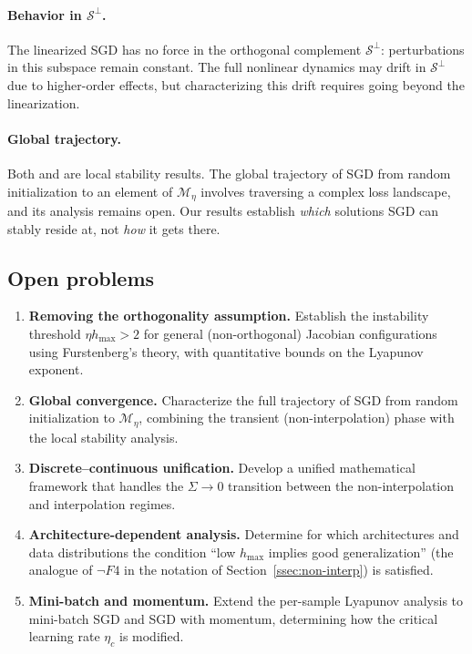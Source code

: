 \documentclass[11pt,a4paper]{article}
\theoremstyle{definition}
\theoremstyle{remark}
\newcommand{\cM}{\mathcal{M}}
\newcommand{\cS}{\mathcal{S}}
\begin{document}
\paragraph{Behavior in $\cS^\perp$.}
The linearized SGD has no force in the orthogonal complement $\cS^\perp$: perturbations
in this subspace remain constant.  The full nonlinear dynamics may drift in $\cS^\perp$
due to higher-order effects, but characterizing this drift requires going beyond the
linearization.

\paragraph{Global trajectory.}
Both  and  are local stability results.
The global trajectory of SGD from random initialization to an element of $\cM_\eta$
involves traversing a complex loss landscape, and its analysis remains open.  Our
results establish \emph{which} solutions SGD can stably reside at, not \emph{how} it
gets there.

\subsection{Open problems}

\begin{enumerate}
  \item \textbf{Removing the orthogonality assumption.}\;
    Establish the instability threshold $\eta h_{\max} > 2$ for general (non-orthogonal)
    Jacobian configurations using Furstenberg's theory, with quantitative bounds on the
    Lyapunov exponent.

  \item \textbf{Global convergence.}\;
    Characterize the full trajectory of SGD from random initialization to $\cM_\eta$,
    combining the transient (non-interpolation) phase with the local stability analysis.

  \item \textbf{Discrete--continuous unification.}\;
    Develop a unified mathematical framework that handles the $\Sigma \to 0$ transition
    between the non-interpolation and interpolation regimes.

  \item \textbf{Architecture-dependent analysis.}\;
    Determine for which architectures and data distributions the condition
    ``low $h_{\max}$ implies good generalization'' (the analogue of $\neg F4$ in the
    notation of Section~\ref{ssec:non-interp}) is satisfied.

  \item \textbf{Mini-batch and momentum.}\;
    Extend the per-sample Lyapunov analysis to mini-batch SGD and SGD with momentum,
    determining how the critical learning rate $\eta_c$ is modified.
\end{enumerate}
\end{document}
